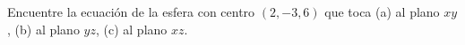 \item Encuentre la ecuación de la esfera con centro $(2, -3, 6)$ que toca (a) al plano $xy$, (b) al plano $yz$, (c) al plano $xz$.
